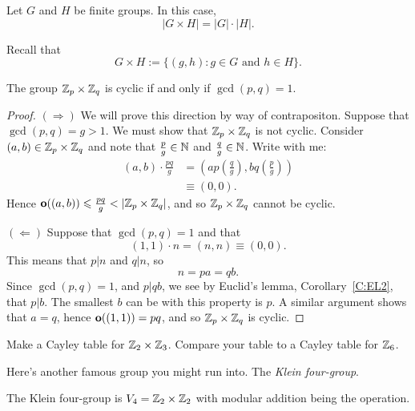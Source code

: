 \documentclass{ximera}
\begin{document}
\begin{lemma}
  Let $G$ and $H$ be finite groups. In this case,
  \[
  |G\times H| = |G|\cdot |H|.
  \]
  \begin{sketch}
    Recall that
    \[
    G\times H := \{(g,h): \text{$g\in G$ and $h\in H$}\}.
    \]
  \end{sketch}
\end{lemma}

\begin{theorem}
  The group $\mathbb Z_p\times \mathbb Z_q$ is cyclic if and only if $\gcd(p,q) =
  1$.
  \begin{proof}
    $(\Rightarrow)$ We will prove this direction by way of
    contrapositon. Suppose that $\gcd(p,q) = g>1$. We must show that
    $\mathbb Z_p\times \mathbb Z_q$ is not cyclic. Consider $(a,b)\in\mathbb Z_p\times\mathbb Z_q$
    and note that $\frac{p}{g}\in\mathbb N$ and $\frac{q}{g}\in\mathbb N$. Write
    with me:
    \begin{align*}
      (a,b) \cdot \frac{pq}{g} &= \left(ap\left(\frac{q}{g}\right),bq\left(\frac{p}{g}\right)\right)\\
      &\equiv (0,0).
    \end{align*}
    Hence $\mathbf o((a,b)) \leqslant \frac{pq}{g} < |\mathbb Z_p\times\mathbb Z_q|$, and so
    $\mathbb Z_p\times\mathbb Z_q$ cannot be cyclic.

    $(\Leftarrow)$ Suppose that $\gcd(p,q) = 1$ and that
    \[
    (1,1)\cdot n = (n,n) \equiv (0,0).
    \]
    This means that $p|n$ and $q|n$, so
    \[
    n = pa = qb.
    \]
    Since $\gcd(p,q) = 1$, and $p|qb$, we see by Euclid's lemma,
    Corollary~\ref{C:EL2}, that $p|b$. The smallest $b$ can be with
    this property is $p$. A similar argument shows that $a = q$, hence
    $\mathbf o((1,1)) = pq$, and so $\mathbb Z_p\times\mathbb Z_q$ is cyclic.
  \end{proof}
\end{theorem}


\begin{exercise}
  Make a Cayley table for $\mathbb Z_2\times\mathbb Z_3$. Compare your table to a
  Cayley table for $\mathbb Z_6$.
\end{exercise}



Here's another famous group you might run into. The \textit{Klein
  four-group}.

\begin{definition}
  The Klein four-group is $V_4 = \mathbb Z_2\times\mathbb Z_2$ with modular addition
  being the operation.
\end{definition}
\end{document}
